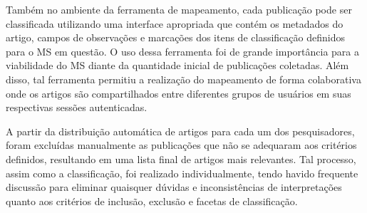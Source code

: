 Também no ambiente da ferramenta de mapeamento, cada publicação pode ser classificada utilizando uma interface apropriada que contém os metadados do artigo, campos de observações e marcações dos itens de classificação definidos para o MS em questão. O uso dessa ferramenta foi de grande importância para a viabilidade do MS diante da quantidade inicial de publicações coletadas. Al\'{e}m disso, tal ferramenta permitiu 
a realiza\c{c}\~{a}o do mapeamento de forma colaborativa onde os artigos s\~{a}o compartilhados entre diferentes grupos de usuários em suas respectivas sess\~{o}es autenticadas.

A partir da distribuição automática de artigos para cada um dos pesquisadores, foram excluídas manualmente as publicações que não se adequaram aos critérios definidos, resultando em uma lista final de \AcceptedPubs artigos mais relevantes. Tal processo, assim como a classificação, foi realizado individualmente, tendo havido frequente discussão para eliminar quaisquer dúvidas e inconsistências de interpretações quanto aos critérios de inclusão, exclusão e facetas de classificação. 

